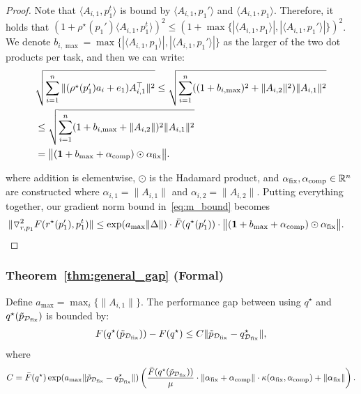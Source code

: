 \begin{proof}
Note that $\langle A_{i, 1}, p_1^t \rangle$ is bound by $\langle A_{i, 1}, p_1' \rangle$ and $\langle A_{i, 1}, p_1 \rangle$. Therefore, it holds that $(1 + \rho^\star(p_1') \langle A_{i, 1}, p_1^t \rangle)^2 \le (1 + \max\{ |\langle A_{i, 1}, p_1 \rangle|, |\langle A_{i, 1}, p_1' \rangle| \})^2$. We denote $b_{i, \max} = \max\{ |\langle A_{i, 1}, p_1 \rangle|, |\langle A_{i, 1}, p_1' \rangle| \}$ as the larger of the two dot products per task, and then we can write:
\begin{align*}
    &\sqrt{\sum_{i=1}^n \|(\rho^\star(p_1') a_i + e_1) A_{i, 1}^\top \|^2} \le \sqrt{\sum_{i = 1}^n ((1 + b_{i, \max})^2 + \|A_{i, 2} \|^2) \| A_{i, 1}\|^2} \\
    &\le \sqrt{\sum_{i = 1}^n (1 + b_{i, \max} + \|A_{i, 2} \|)^2 \| A_{i, 1}\|^2}  \\
    &= \big\| (\mathbf{1} + b_{\max} + \alpha_{\text{comp}}) \odot \alpha_{\text{fix}} \big\|.
\end{align*}

where addition is elementwise, $\odot$ is the Hadamard product, and $\alpha_{\text{fix}}, \alpha_{\text{comp}} \in \mathbb{R}^n$ are constructed where $\alpha_{i, 1} = \|A_{i, 1}\|$ and $\alpha_{i, 2} = \|A_{i, 2}\|$. Putting everything together, our gradient norm bound in~\eqref{eq:m_bound} becomes
\begin{align*}
    \|\triangledown^2_{r,p_1}F(r^\star(p_1'),p_1^t)\| &\le\exp( a_{\max} \| \Delta \| ) \cdot  \bar{F}(q^\star(p_1')) \cdot \big\| (\mathbf{1} + b_{\max} + \alpha_{\text{comp}}) \odot \alpha_{\text{fix}} \big\|.
\end{align*}
\end{proof}

\subsubsection{Theorem~\ref{thm:general_gap} (Formal)}




\begin{theorem}\label{thm:gap_lipschitz}
Define $a_{\max} = \max_i \{\|A_{i, 1} \|\}$. The performance gap between using $q^\star$ and $q^\star(\tilde{p}_{\mathcal{D}_{\text{fix}}})$ is bounded by:
\begin{align*}
F(q^\star(\tilde p_{\mathcal{D}_{\text{fix}}}))-F(q^\star) \le C \|\tilde{p}_{\mathcal{D}_{\text{fix}}}-q^\star_{\mathcal{D}_{\text{fix}}}\|,
\end{align*}
where 
\begin{align*}
    C = \bar{F}(q^\star) \exp(a_{\max} \|\tilde{p}_{\mathcal{D}_{\text{fix}}}-q^\star_{\mathcal{D}_{\text{fix}}}\|) \left( \frac{\bar{F}(q^\star(\tilde{p}_{\mathcal{D}_{\text{fix}}}))}{\mu} \cdot \|\alpha_{\text{fix}} + \alpha_{\text{comp}} \| \cdot \kappa(\alpha_{\text{fix}}, \alpha_{\text{comp}})   + \|\alpha_{\text{fix}} \| \right).
\end{align*}
\end{theorem}

